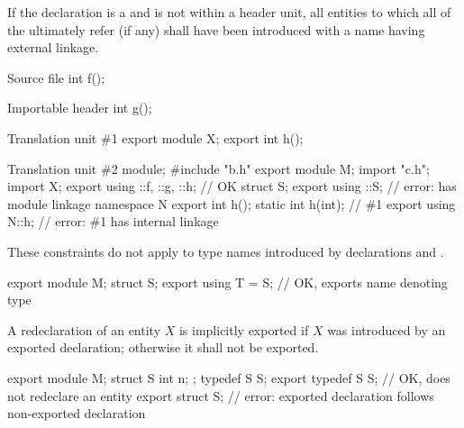\pnum
If the declaration is a 
and is not within a header unit,
all entities to which all of the
 ultimately refer (if any)
shall have been introduced with a name having external linkage.
\begin{example}
\begin{codeblocktu}{Source file }
int f();
\end{codeblocktu}

\begin{codeblocktu}{Importable header }
int g();
\end{codeblocktu}

\begin{codeblocktu}{Translation unit \#1}
export module X;
export int h();
\end{codeblocktu}

\begin{codeblocktu}{Translation unit \#2}
module;
#include "b.h"
export module M;
import "c.h";
import X;
export using ::f, ::g, ::h;     // OK
struct S;
export using ::S;               // error:  has module linkage
namespace N {
  export int h();
  static int h(int);            // \#1
}
export using N::h;              // error: \#1 has internal linkage
\end{codeblocktu}
\end{example}
\begin{note}
These constraints do not apply to
type names introduced by  declarations
and .
\begin{example}
\begin{codeblock}
export module M;
struct S;
export using T = S;             // OK, exports name  denoting type 
\end{codeblock}
\end{example}
\end{note}

\pnum
A redeclaration of an entity $X$
is implicitly exported
if $X$ was introduced by an exported declaration;
otherwise it shall not be exported.
\begin{example}
\begin{codeblock}
export module M;
struct S { int n; };
typedef S S;
export typedef S S;             // OK, does not redeclare an entity
export struct S;                // error: exported declaration follows non-exported declaration
\end{codeblock}
\end{example}

